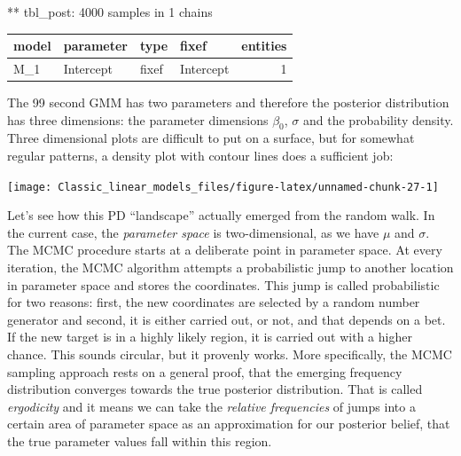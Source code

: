 \documentclass[]{svmono}
\newenvironment{Shaded}{\begin{snugshade}}{\end{snugshade}}
\newcommand{\KeywordTok}[1]{\textcolor[rgb]{0.13,0.29,0.53}{\textbf{#1}}}
\newcommand{\DataTypeTok}[1]{\textcolor[rgb]{0.13,0.29,0.53}{#1}}
\newcommand{\DecValTok}[1]{\textcolor[rgb]{0.00,0.00,0.81}{#1}}
\newcommand{\StringTok}[1]{\textcolor[rgb]{0.31,0.60,0.02}{#1}}
\newcommand{\OperatorTok}[1]{\textcolor[rgb]{0.81,0.36,0.00}{\textbf{#1}}}
\newcommand{\NormalTok}[1]{#1}
\begin{document}
** tbl\_post: 4000 samples in 1 chains

\begin{longtable}[]{@{}llllr@{}}
\toprule
model & parameter & type & fixef & entities\tabularnewline
\midrule
\endhead
M\_1 & Intercept & fixef & Intercept & 1\tabularnewline
\bottomrule
\end{longtable}

The 99 second GMM has two parameters and therefore the posterior
distribution has three dimensions: the parameter dimensions \(\beta_0\),
\(\sigma\) and the probability density. Three dimensional plots are
difficult to put on a surface, but for somewhat regular patterns, a
density plot with contour lines does a sufficient job:

\begin{Shaded}
\end{Shaded}

\texttt{[image: Classic\_linear\_models\_files/figure-latex/unnamed-chunk-27-1]}

Let's see how this PD ``landscape'' actually emerged from the random
walk. In the current case, the \emph{parameter space} is
two-dimensional, as we have \(\mu\) and \(\sigma\). The MCMC procedure
starts at a deliberate point in parameter space. At every iteration, the
MCMC algorithm attempts a probabilistic jump to another location in
parameter space and stores the coordinates. This jump is called
probabilistic for two reasons: first, the new coordinates are selected
by a random number generator and second, it is either carried out, or
not, and that depends on a bet. If the new target is in a highly likely
region, it is carried out with a higher chance. This sounds circular,
but it provenly works. More specifically, the MCMC sampling approach
rests on a general proof, that the emerging frequency distribution
converges towards the true posterior distribution. That is called
\emph{ergodicity} and it means we can take the \emph{relative
frequencies} of jumps into a certain area of parameter space as an
approximation for our posterior belief, that the true parameter values
fall within this region.
\end{document}
